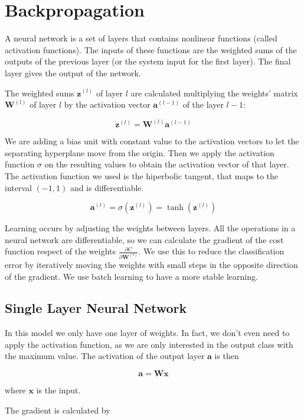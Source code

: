 \documentclass{article}
\begin{document}
\section{Backpropagation}
A neural network is a set of layers that contains nonlinear functions (called activation functions). The inputs of these functions are the weighted sums of the outputs of the previous layer (or the system input for the first layer). The final layer gives the output of the network. 

The weighted sums $\mathbf{z}^{(l)}$ of layer $l$ are calculated multiplying the weights' matrix $\mathbf{W}^{(l)}$ of layer $l$ by the activation vector $\mathbf{a}^{(l-1)}$ of the layer $l-1$:

$$\mathbf{z}^{(l)} = \mathbf{W}^{(l)}\mathbf{a}^{(l-1)}$$

We are adding a bias unit with constant value to the activation vectors to let the separating hyperplane move from the origin. Then we apply the activation function $\sigma$ on the resulting values to obtain the activation vector of that layer. The activation function we used is the hiperbolic tangent, that maps to the interval $(-1,1)$ and is differentiable.

$$\mathbf{a}^{(l)} = \sigma(\mathbf{z}^{(l)}) = \tanh(\mathbf{z}^{(l)})$$

Learning occurs by adjusting the weights between layers. All the operations in a neural network are differentiable, so we can calculate the gradient of the cost function respect of the weights $\frac{\partial C}{\partial \mathbf{W}^{(l)}}$. We use this to reduce the classification error by iteratively moving the weights with small steps in the opposite direction of the gradient. We use batch learning to have a more stable learning.




\subsection{Single Layer Neural Network}

In this model we only have one layer of weights. In fact, we don't even need to apply the activation function, as we are only interested in the output class with the maximum value. The activation of the output layer $\mathbf{a}$ is then

$$\mathbf{a} = \mathbf{W}\mathbf{x}$$

where $\mathbf{x}$ is the input.

The gradient is calculated by
\end{document}

